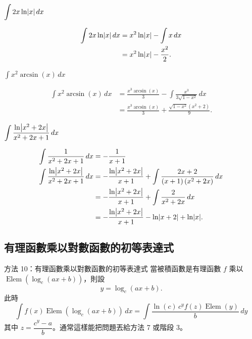 \documentclass{beamer}
\newcommand{\Left} {\mathopen{}\mathclose\bgroup\left}
\newcommand{\Right}{\aftergroup\egroup\right}
\newcommand{\Elem}{\operatorname{Elem}}
\theoremstyle{remark}
\begin{document}
\begin{CJK}{UTF8}{bsmi}
\begin{frame}{$\displaystyle \int 2x \ln \Left| x \Right|\,dx$}
  \begin{solution}
    \begin{align*}
      \int 2x \ln \Left| x \Right|\,dx &= x^2 \ln \Left| x \Right| - \int x\,dx\\
	&= x^2 \ln \Left| x \Right| - \frac{x^2}{2}.
    \end{align*}
  \end{solution}
\end{frame}

\begin{frame}{$\displaystyle \int x^2 \arcsin(x)\,dx$}
  \begin{solution}
    \begin{align*}
      \int x^2 \arcsin(x)\,dx &= \frac{x^3 \arcsin(x)}{3} - \int \frac{x^3}{3 \sqrt{1 - x^2}}\,dx\\
	&= \frac{x^3 \arcsin(x)}{3} + \frac{\sqrt{1 - x^2} \left( x^2 + 2 \right)}{9}.
    \end{align*}
  \end{solution}
\end{frame}

\begin{frame}{$\displaystyle \int \frac{\ln \Left| x^2 + 2x \Right|}{x^2 + 2x + 1}\,dx$}
  \begin{solution}
    \begin{align*}
      \int \frac{1}{x^2 + 2x + 1}\,dx &= -\frac{1}{x+1}\\
      \int \frac{\ln \Left| x^2 + 2x \Right|}{x^2 + 2x + 1}\,dx
	&= -\frac{\ln \Left| x^2 + 2x \Right|}{x+1} + \int \frac{2x + 2}{(x+1) \left( x^2 + 2x \right)}\,dx\\
	&= -\frac{\ln \Left| x^2 + 2x \Right|}{x+1} + \int \frac{2}{x^2 + 2x}\,dx\\
	&= -\frac{\ln \Left| x^2 + 2x \Right|}{x+1} - \ln \Left| x+2 \Right| + \ln \Left| x \Right|.
    \end{align*}
  \end{solution}
\end{frame}

\subsection[對數替代]{有理函數乘以對數函數的初等表達式}
\begin{frame}{方法 10：有理函數乘以對數函數的初等表達式}
  當被積函數是有理函數 $f$ 乘以 $\Elem(\log_c(ax + b))$，則設
  \[y = \log_c(ax + b).\]
  此時
  \[\int f(x) \Elem(\log_c(ax + b))\,dx = \int \frac{\ln(c)\,c^y f(z) \Elem(y)}{b}\,dy\]
  其中 $z = \dfrac{c^y - a}{b}$。通常這樣能把問題丟給方法 7 或階段 3。
\end{frame}


\end{CJK}
\end{document}
